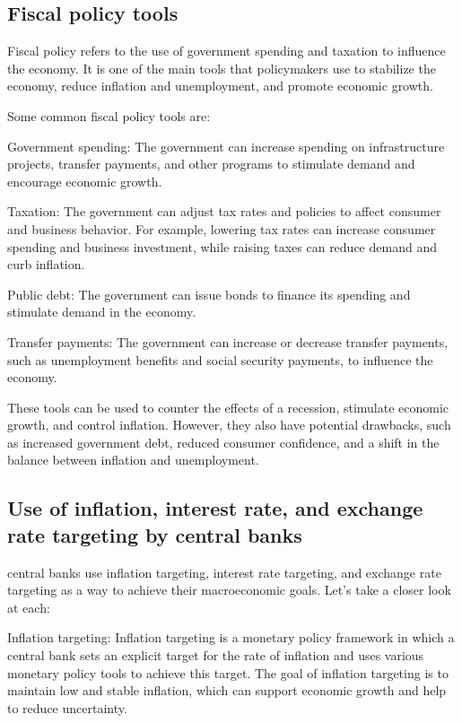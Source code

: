 \documentclass[12pt, a4paper, oneside]{article}
\begin{document}
\subsection{ Fiscal policy tools }
Fiscal policy refers to the use of government spending and taxation to influence the economy. It is one of the main tools that policymakers use to stabilize the economy, reduce inflation and unemployment, and promote economic growth.

Some common fiscal policy tools are:

Government spending: The government can increase spending on infrastructure projects, transfer payments, and other programs to stimulate demand and encourage economic growth.

Taxation: The government can adjust tax rates and policies to affect consumer and business behavior. For example, lowering tax rates can increase consumer spending and business investment, while raising taxes can reduce demand and curb inflation.

Public debt: The government can issue bonds to finance its spending and stimulate demand in the economy.

Transfer payments: The government can increase or decrease transfer payments, such as unemployment benefits and social security payments, to influence the economy.

These tools can be used to counter the effects of a recession, stimulate economic growth, and control inflation. However, they also have potential drawbacks, such as increased government debt, reduced consumer confidence, and a shift in the balance between inflation and unemployment.




\subsection{ Use of inflation, interest rate, and exchange rate targeting by central banks }
central banks use inflation targeting, interest rate targeting, and exchange rate targeting as a way to achieve their macroeconomic goals. Let's take a closer look at each:

Inflation targeting: Inflation targeting is a monetary policy framework in which a central bank sets an explicit target for the rate of inflation and uses various monetary policy tools to achieve this target. The goal of inflation targeting is to maintain low and stable inflation, which can support economic growth and help to reduce uncertainty.
\end{document}
